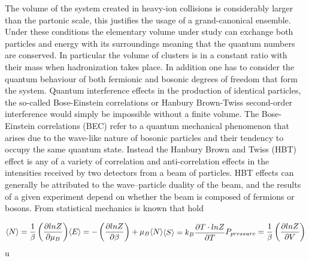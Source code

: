 \documentclass[12pt,a4paper]{book}
\begin{document}
	The volume of the system created in	heavy-ion collisions is considerably larger than the partonic scale, this justifies the usage of a grand-canonical ensemble. Under these conditions the elementary volume under study can exchange both particles and energy with its surroundings meaning that the quantum numbers are conserved. In particular the volume of clusters is in a constant ratio with their mass when hadronization takes place.  In addition one has to consider the quantum behaviour of both fermionic and bosonic degrees of freedom that form the system. Quantum interference effects in the production of identical particles, the so-called Bose-Einstein correlations or Hanbury Brown-Twiss second-order interference would simply be impossible without a finite volume. The Bose-Einstein correlations (BEC) refer to a quantum mechanical phenomenon that arises due to the wave-like nature of bosonic particles and their tendency to occupy the same quantum state. Instead the Hanbury Brown and Twiss (HBT) effect is any of a variety of correlation and anti-correlation effects in the intensities received by two detectors from a beam of particles. HBT effects can generally be attributed to the wave–particle duality of the beam, and the results of a given experiment depend on whether the beam is composed of fermions or bosons. From statistical mechanics is known that hold
	
	\begin{equation}
		\begin{subequations}
			\begin{align}
			\langle N \rangle = \frac{1}{\beta} \left( \frac{\partial lnZ}{\partial \mu_B}\right) \\
		\end{align}
	\end{subequations}
	\begin{subequations}
	\begin{align}
				\langle E \rangle = - \left( \frac{\partial lnZ}{\partial \beta}\right) + \mu_B \langle N \rangle \\
	\end{align}
	\end{subequations}
	\begin{subequations}
		\begin{align}
		\langle S \rangle = k_B \frac{\partial T \cdot lnZ}{\partial T} \\
		\end{align}
	\end{subequations}
	\begin{subequations}
		\begin{align}
	P_{pressure} = \frac{1}{\beta} \left( \frac{\partial lnZ}{\partial V}\right) \\
		\end{align}
	\end{subequations}
	\end{equation}u
	
\end{document}
